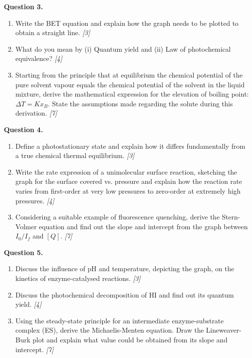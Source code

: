 \documentclass[11pt,a4paper]{article}
\newcommand{\pts}[1]{\hfill \textit{[#1]}}
\begin{document}
\bigskip

\noindent \textbf{Question 3.}
\begin{enumerate}[label=(\alph*)]
  \item Write the BET equation and explain how the graph needs to be plotted to obtain a straight line. \pts{3}
  \item What do you mean by (i) Quantum yield and (ii) Law of photochemical equivalence? \pts{4}
  \item Starting from the principle that at equilibrium the chemical potential of the pure solvent vapour equals the chemical potential of the solvent in the liquid mixture, derive the mathematical expression for the elevation of boiling point: $\Delta T = K x_B$. State the assumptions made regarding the solute during this derivation. \pts{7}
\end{enumerate}

\bigskip

\noindent \textbf{Question 4.}
\begin{enumerate}[label=(\alph*)]
  \item Define a photostationary state and explain how it differs fundamentally from a true chemical thermal equilibrium. \pts{3}
  \item Write the rate expression of a unimolecular surface reaction, sketching the graph for the surface covered vs. pressure and explain how the reaction rate varies from first-order at very low pressures to zero-order at extremely high pressures. \pts{4}
  \item Considering a suitable example of fluorescence quenching, derive the Stern-Volmer equation and find out the slope and intercept from the graph between $I_0/I_f$ and $[Q]$. \pts{7}
\end{enumerate}

\bigskip

\noindent \textbf{Question 5.}
\begin{enumerate}[label=(\alph*)]
  \item Discuss the influence of pH and temperature, depicting the graph, on the kinetics of enzyme-catalysed reactions. \pts{3}
  \item Discuss the photochemical decomposition of HI and find out its quantum yield. \pts{4}
  \item Using the steady-state principle for an intermediate enzyme-substrate complex (ES), derive the Michaelis-Menten equation. Draw the Lineweaver-Burk plot and explain what value could be obtained from its slope and intercept. \pts{7}
\end{enumerate}
\end{document}
